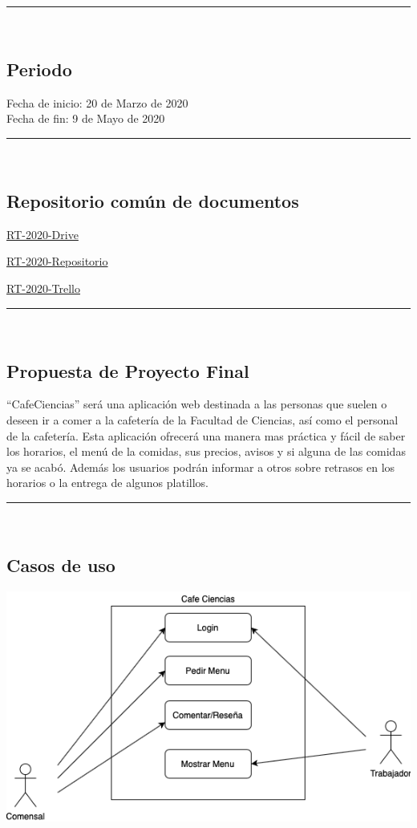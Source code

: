 \documentclass{article}
\begin{document}
\rule{0.8\textwidth}{.8pt}\\

\subsection*{Periodo}
Fecha de inicio: 20 de Marzo de 2020\\
\indent Fecha de fin: 9 de Mayo de 2020\\


\rule{0.8\textwidth}{.8pt}\\

\subsection*{Repositorio común de documentos}
\href{https://drive.google.com/open?id=13f9jp3Oli6AQF1Ap8VhoEKFXTPULumos}{RT-2020-Drive}

\href{https://github.com/mildewyPrawn/CafeCiencias}{RT-2020-Repositorio}

\href{https://trello.com/b/rwdAGuSi/cafeciencias}{RT-2020-Trello}

\rule{0.8\textwidth}{.8pt}\\

\subsection*{Propuesta de Proyecto Final}

“CafeCiencias” será una aplicación web destinada a las personas que suelen o
deseen ir a comer a la cafetería de la Facultad de Ciencias, así como el personal
de la cafetería. Esta aplicación ofrecerá una manera mas práctica y fácil de
saber los horarios, el menú de la comidas, sus precios, avisos y si alguna de las
comidas ya se  acabó. Además los usuarios podrán informar a otros sobre retrasos
en los horarios o la entrega de algunos platillos.

\rule{0.8\textwidth}{.8pt}\\

\subsection*{Casos de uso}

\begin{center}
  \includegraphics[scale=.75]{../imagenes/CasoDeUsos.png}
\end{center}
\end{document}

